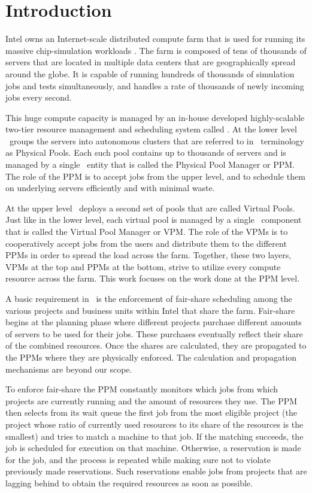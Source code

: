 
\chapter{Introduction}

Intel owns an Internet-scale distributed compute farm that is used for
running its massive chip-simulation workloads
\cite[p.\ 78]{bentley01,evans03:book}.
The farm is composed of tens of thousands of servers that are located
in multiple data centers that are geographically spread around the
globe.
It is capable of running hundreds of thousands of simulation jobs and
tests simultaneously, and handles a rate of thousands of newly
incoming jobs every second.

This huge compute capacity is managed by an in-house developed
highly-scalable two-tier resource management and scheduling system
called \nb.
At the lower level \nb\ groups the servers into autonomous clusters
that are referred to in \nb\ terminology as Physical Pools.
Each such pool contains up to thousands of servers and is managed by a
single \nb\ entity that is called the Physical Pool Manager or PPM.
The role of the PPM is to accept jobs from the upper level, and to
schedule them on underlying servers efficiently and with minimal
waste.

At the upper level \nb\ deploys a second set of pools that are called
Virtual Pools.
Just like in the lower level, each virtual pool is managed by a single
\nb\ component that is called the Virtual Pool Manager or VPM.
The role of the VPMs is to cooperatively accept jobs from the users
and distribute them to the different PPMs in order to spread the load
across the farm.
Together, these two layers, VPMs at the top and PPMs at the
bottom, strive to utilize every compute resource across the farm.
This work focuses on the work done at the PPM level.

A basic requirement in \nb\ is the enforcement of fair-share
scheduling among the various projects and business units within Intel
that share the farm.
Fair-share begins at the planning phase where different projects
purchase different amounts of servers to be used for their jobs.
These purchases eventually reflect their share of the combined
resources.
Once the shares are calculated, they are propagated to the PPMs where
they are physically enforced. The calculation and propagation
mechanisms are beyond our scope.

To enforce fair-share the PPM constantly monitors which jobs from
which projects are currently running and the amount of resources they
use.
The PPM then selects from its wait queue the first job from the most
eligible project (the project whose ratio of currently used resources
to its share of the resources is the smallest) and tries to match a
machine to that job.
If the matching succeeds, the job is scheduled for execution on that
machine.
Otherwise, a reservation is made for the job, and the process is
repeated while making sure not to violate previously made
reservations.
Such reservations enable jobs from projects that are lagging behind to
obtain the required resources as soon as possible.

